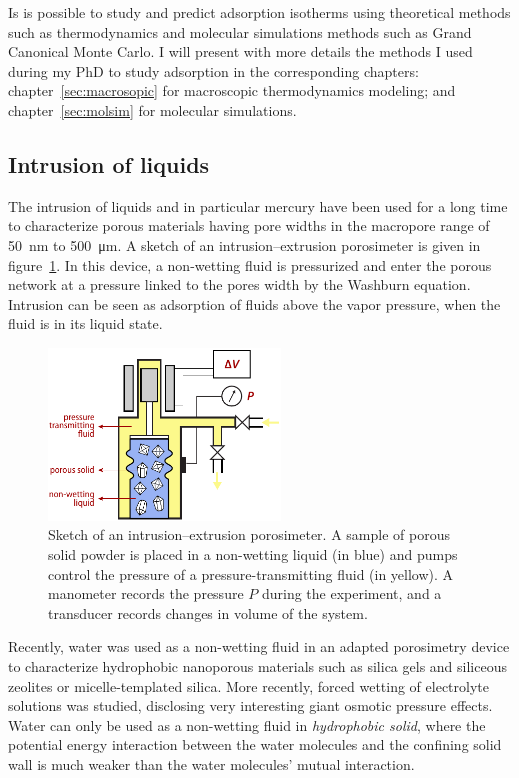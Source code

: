 \documentclass[thesis]{subfiles}
\begin{document}
Is is possible to study and predict adsorption isotherms using theoretical
methods such as thermodynamics and molecular simulations methods such as Grand
Canonical Monte Carlo. I will present with more details the methods I used
during my PhD to study adsorption in the corresponding chapters:
chapter~\ref{sec:macrosopic} for macroscopic thermodynamics modeling; and
chapter~\ref{sec:molsim} for molecular simulations.

\subsection{Intrusion of liquids}

The intrusion of liquids and in particular mercury have been used for a long
time to characterize porous materials having pore widths in the macropore range
of \SI{50}{nm} to \SI{500}{\um}\cite{Rouquerol2011}. A sketch of an
intrusion--extrusion porosimeter is given in figure~\ref{fig:porosimeter}. In
this device, a non-wetting fluid is pressurized and enter the porous network at
a pressure linked to the pores width by the Washburn equation. Intrusion can be
seen as adsorption of fluids above the vapor pressure, \ie when the fluid is in
its liquid state.

\begin{figure}[htb]
    \centering
    \includegraphics[width=0.55\textwidth]{figures/images/porosimeter}
    \caption{Sketch of an intrusion--extrusion porosimeter. A sample of porous
    solid powder is placed in a non-wetting liquid (in blue) and pumps control
    the pressure of a pressure-transmitting fluid (in yellow). A manometer
    records the pressure $P$ during the experiment, and a transducer records
    changes in volume of the system.}
  \label{fig:porosimeter}
\end{figure}

Recently, water was used as a non-wetting fluid in an adapted porosimetry
device to characterize hydrophobic nanoporous materials such as silica
gels\cite{Fadeev1997} and siliceous zeolites\cite{Eroshenko2001, Eroshenko2002}
or micelle-templated silica\cite{Lefevre2004}. More recently, forced wetting of
electrolyte solutions was studied, disclosing very interesting giant osmotic
pressure effects\cite{Liu2009, MichelinJamois2015}. Water can only be used as a
non-wetting fluid in \emph{hydrophobic solid}, where the potential energy
interaction between the water molecules and the confining solid wall is much
weaker than the water molecules' mutual interaction.
\end{document}

